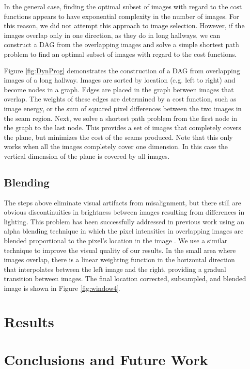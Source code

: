 \documentclass[runningheads]{llncs}
\begin{document}
In the general case, finding the optimal subset of images with regard to the cost functions appears to have exponential complexity in the number of images. For this reason, we did not attempt this approach to image selection. However, if the images overlap only in one direction, as they do in long hallways, we can construct a DAG from the overlapping images and solve a simple shortest path problem to find an optimal subset of images with regard to the cost functions.

Figure \ref{fig:DynProg} demonstrates the construction of a DAG from overlapping images of a long hallway. Images are sorted by location (e.g. left to right) and become nodes in a graph. Edges are placed in the graph between images that overlap. The weights of these edges are determined by a cost function, such as image energy, or the sum of squared pixel differences between the two images in the seam region. Next, we solve a shortest path problem from the first node in the graph to the last node. This provides a set of images that completely covers the plane, but minimizes the cost of the seams produced. Note that this only works when all the images completely cover one dimension. In this case the vertical dimension of the plane is covered by all images. 

\subsection{Blending}

The steps above eliminate visual artifacts from misalignment, but there still are obvious discontinuities in brightness between images resulting from differences in lighting. This problem has been successfully addressed in previous work using an alpha blending technique in which the pixel intensities in overlapping images are blended proportional to the pixel's location in the image \cite{liu2010indoor}. We use a similar technique to improve the visual quality of our results. In the small area where images overlap, there is a linear weighting function in the horizontal direction that interpolates between the left image and the right, providing a gradual transition between images. The final location corrected, subsampled, and blended image is shown in Figure \ref{fig:window4}.

\section{Results}
\label{sec:results}

\section{Conclusions and Future Work}
\label{sec:results}



\small

\end{document}
